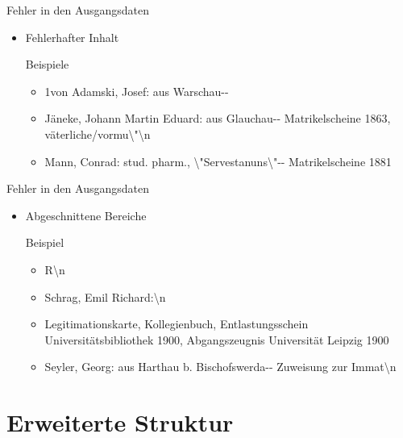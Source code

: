 \documentclass[12pt]{beamer}
\begin{document}
\begin{large}
\begin{frame}{Fehler in den Ausgangsdaten}
 \begin{itemize}
  \item Fehlerhafter Inhalt 
  \begin{block}{Beispiele}
   \begin{itemize}
    \normalsize   
    \item 1von Adamski, Josef: aus Warschau-{}-
    \vspace*{-0.25cm} 
    \item Jäneke, Johann Martin Eduard: aus Glauchau-{}- Matrikelscheine 1863, väterliche/vormu\textbackslash "{}\textbackslash n
	\vspace*{-0.25cm}    
    \item Mann, Conrad: stud. pharm., \textbackslash "{}Servestanuns\textbackslash "{}-{}- Matrikelscheine 1881
   \end{itemize}
  \end{block} 
  
 \end{itemize}
\end{frame}


\begin{frame}{Fehler in den Ausgangsdaten}
 \begin{itemize}
  \item Abgeschnittene Bereiche
  \begin{block}{Beispiel}
   \begin{itemize}
    \normalsize
    \item R\textbackslash n
	\vspace*{-0.25cm}    
    \item Schrag, Emil Richard:\textbackslash n
	\vspace*{-0.25cm}    
    \item Legitimationskarte, Kollegienbuch, Entlastungsschein Universitätsbibliothek 1900, Abgangszeugnis Universität Leipzig 1900
    \vspace*{-0.25cm}
    \item Seyler, Georg: aus Harthau b. Bischofswerda-{}- Zuweisung zur Immat\textbackslash n
   \end{itemize}
  \end{block}
  
 \end{itemize}
\end{frame}




\section{Erweiterte Struktur}

\end{large}
\end{document}
